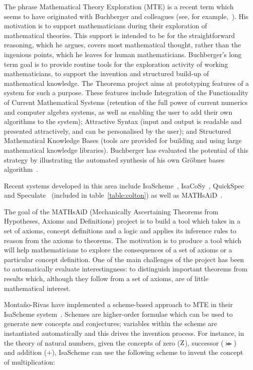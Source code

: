 The phrase Mathematical Theory Exploration (MTE) is a recent term
which seems to have originated with Buchberger and colleagues (see,
for example,~\cite{buchberger}). His motivation is to support
mathematicians during their exploration of mathematical theories. This
support is intended to be for the straightforward reasoning, which he
argues, covers most mathematical thought, rather than the ingenious
points, which he leaves for human mathematicians. Buchberger's long
term goal is to provide routine tools for the exploration activity of
working mathematicians, to support the invention and structured
build-up of mathematical knowledge. The Theorema project aims at
prototyping features of a system for such a purpose. These features
include Integration of the Functionality of Current Mathematical
Systems (retention of the full power of current numerics and computer
algebra systems, as well as enabling the user to add their own
algorithms to the system); Attractive Syntax (input and output is
readable and presented attractively, and can be personalised by the
user); and Structured Mathematical Knowledge Bases (tools are provided
for building and using large mathematical knowledge
libraries). Buchberger has evaluated the potential of this strategy by
illustrating the automated synthesis of his own Gr\"obner bases
algorithm~\cite{buchberger:04}.

Recent systems developed in this area include IsaScheme~\cite{MontanoRivas2011},
IsaCoSy~\cite{Johansson.Dixon.Bundy:conjecture-generation},
QuickSpec~\cite{QuickSpec} and Speculate~\cite{braquehais2017speculate}
(included in table~\ref{table:colton}) as well as MATHsAiD~\cite{roy}.

The goal of the MATHsAiD (Mechanically Ascertaining Theorems from Hypotheses,
Axioms and Definitions) project is to build a tool which takes in a set of
axioms, concept definitions and a logic and applies its inference rules to
reason from the axioms to theorems. The motivation is to produce a tool which
will help mathematicians to explore the consequences of a set of axioms or a
particular concept definition. One of the main challenges of the project has
been to automatically evaluate interestingness: to distinguish important
theorems from results which, although they follow from a set of axioms, are of
little mathematical interest.

Monta{\~n}o-Rivas \etal{} have implemented a scheme-based approach to MTE in their
IsaScheme system~\cite{MontanoRivas2011}. Schemes are higher-order formulae
which can be used to generate new concepts and conjectures; variables within the
scheme are instantiated automatically and this drives the invention process.
For instance, in the theory of natural numbers, given the concepts of zero
($\text{Z}$), successor ($\Succ$) and addition ($\plus$), IsaScheme can use the
following scheme to invent the concept of multiplication:

